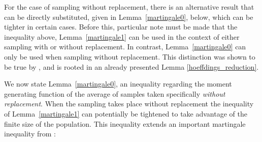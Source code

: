 For the case of sampling without replacement, there is an alternative result that can be directly substituted, given in Lemma~\ref{martingale0}, below, which can be tighter in certain cases.
Before this, particular note must be made that the inequality above, Lemma~\ref{martingale1} can be used in the context of either sampling with or without replacement.
In contrast, Lemma~\ref{martingale0} can only be used when sampling without replacement. 
This distinction was shown to be true by \cite{hoeffding1}, and is rooted in an already presented Lemma \ref{hoeffdings_reduction}.

We now state Lemma~\ref{martingale0}, an inequality regarding the moment generating function of the average of samples taken specifically \textit{without replacement}.
When the sampling takes place without replacement the inequality of Lemma~\ref{martingale1} can potentially be tightened to take advantage of the finite size of the population.
This inequality extends an important martingale inequality from \cite{bardenet2015}:

